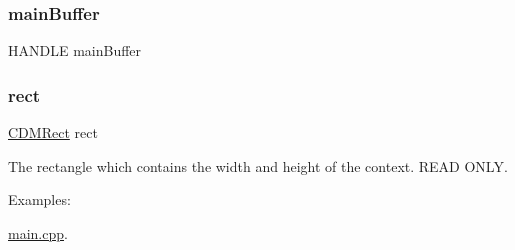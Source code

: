 \mbox{\label{struct_c_d_m_context_ad227f466f24fdd059e08e196f7fbab7f}} 
\subsubsection{\texorpdfstring{main\+Buffer}{mainBuffer}}
{\footnotesize\ttfamily H\+A\+N\+D\+LE main\+Buffer}

\mbox{\label{struct_c_d_m_context_aa61e26c3b59930152cdaa0ce2dac8b14}} 
\subsubsection{\texorpdfstring{rect}{rect}}
{\footnotesize\ttfamily \mbox{\hyperlink{_c_d_m_8h_a23402dc2128c3c7f1e88e505a5631b9c}{C\+D\+M\+Rect}} rect}



The rectangle which contains the width and height of the context. R\+E\+AD O\+N\+LY. 

\begin{Desc}
\item[Examples\+: ]\par
\mbox{\hyperlink{main_8cpp-example}{main.\+cpp}}.\end{Desc}
